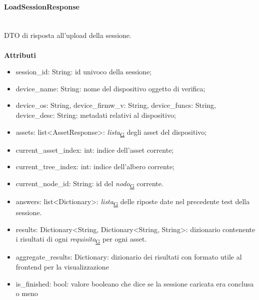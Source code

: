 \documentclass[a4paper,12pt]{article}
\begin{document}
                \paragraph{LoadSessionResponse}\mbox{}\\
                    DTO di risposta all'upload della sessione.\\\\
                    \textbf{Attributi}
                    \begin{itemize}
                        \item {\ttfamily session\_id: String}: id univoco della sessione;
                        \item {\ttfamily device\_name: String}: nome del dispositivo oggetto di verifica;
                        \item {\ttfamily device\_os: String}, {\ttfamily device\_firmw\_v: String}, {\ttfamily device\_funcs: String}, {\ttfamily device\_desc: String}: metadati relativi al dispositivo;
                        \item {\ttfamily assets: list<AssetResponse>}: \textit{lista}\textsubscript{\href{https://atlasteam9.github.io/Atlas/glossario.html\#Lista}{G}} degli asset del dispositivo;
                        \item {\ttfamily current\_asset\_index: int}: indice dell'asset corrente;
                        \item {\ttfamily current\_tree\_index: int}: indice dell'albero corrente;
                        \item {\ttfamily current\_node\_id: String}: id del \textit{nodo}\textsubscript{\href{https://atlasteam9.github.io/Atlas/glossario.html\#Nodo}{G}} corrente.
                        \item {\ttfamily answers: list<Dictionary>}: \textit{lista}\textsubscript{\href{https://atlasteam9.github.io/Atlas/glossario.html\#Lista}{G}} delle riposte date nel precedente test della sessione.
                        \item {\ttfamily results: Dictionary<String, Dictionary<String, String>}: dizionario contenente i risultati di ogni \textit{requisito}\textsubscript{\href{https://atlasteam9.github.io/Atlas/glossario.html\#Requisito}{G}} per ogni asset. 
                        \item {\ttfamily aggregate\_results: Dictionary}: dizionario dei risultati con formato utile al frontend per la visualizzazione
                        \item {\ttfamily is\_finished: bool}: valore booleano che dice se la sessione caricata era conclusa o meno
                    \end{itemize}
\end{document}

